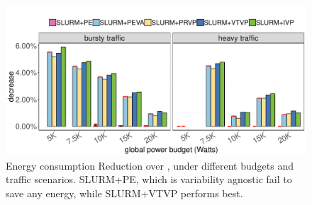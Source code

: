 \begin{figure}[ht!]
	\centering
  \includegraphics[width=.9\columnwidth]{power_aware_job_scheduling/figures/total_energy_115W}
	\caption{Energy consumption Reduction over \DefaultSched, under different budgets and 
					traffic scenarios. SLURM+PE, which is variability agnostic fail to save any energy,
					while SLURM+VTVP performs best.}
	\label{fig:total_energy_consumption}
\end{figure}

